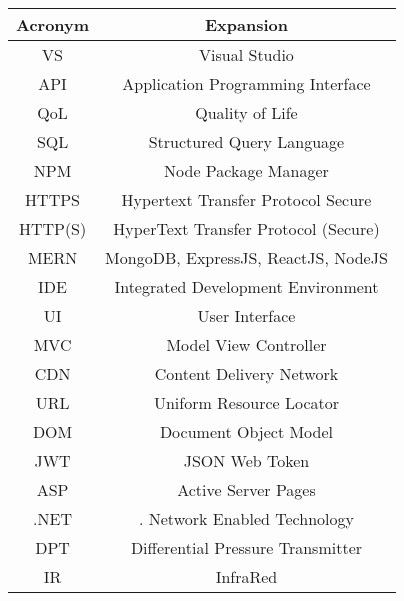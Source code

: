 \thispagestyle{plain}

\begin{center}
\begin{tabular}{||c c ||} 
 \hline
\textbf{Acronym} & \textbf{Expansion} \\ [0.5ex] 
 \hline\hline
 VS & Visual Studio  \\ 
 \hline
API & Application Programming Interface \\ 
 \hline
QoL & Quality of Life \\ 
 \hline
SQL & Structured Query Language \\ 
 \hline
NPM & Node Package Manager \\ 
 \hline
HTTPS & Hypertext Transfer Protocol Secure \\ 
 \hline
HTTP(S) &
HyperText Transfer Protocol (Secure) \\ 
 \hline
MERN & MongoDB, ExpressJS, ReactJS, NodeJS \\ 
 \hline
IDE & Integrated Development Environment \\ 
 \hline
UI & User Interface \\ 
 \hline
MVC & Model View Controller \\ 
 \hline
CDN & Content Delivery Network\\ 
 \hline
URL & Uniform Resource Locator\\ 
 \hline
DOM & Document Object Model \\ 
 \hline
JWT & JSON Web Token \\ 
 \hline
ASP & Active Server Pages \\ 
\hline
.NET & . Network Enabled Technology\\    
 \hline
\hline
DPT & Differential Pressure Transmitter\\
\hline
\hline
IR & InfraRed \\
\hline
\end{tabular}
\end{center}

